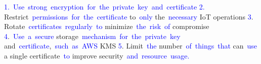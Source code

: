 \documentclass{article}
\begin{document}
\begin{tcolorbox}[colframe=black,colback=white]
{}\textcolor{blue}{1}\textcolor{blue}{.}\textcolor{blue}{~Use}\textcolor{blue}{~strong}\textcolor{blue}{~encryption}\textcolor{blue}{~for}\textcolor{blue}{~the}\textcolor{blue}{~private}\textcolor{blue}{~key}\textcolor{blue}{~and}\textcolor{blue}{~certificate}
\textcolor{blue}{2}\textcolor{blue}{.} Restrict\textcolor{blue}{~permissions}\textcolor{blue}{~for}\textcolor{blue}{~the}\textcolor{blue}{~certificate} to\textcolor{blue}{~only} the\textcolor{blue}{~necessary} IoT operations\textcolor{blue}{
}\textcolor{blue}{3}. Rotate\textcolor{blue}{~certificates}\textcolor{blue}{~regularly}\textcolor{blue}{~to} minimize\textcolor{blue}{~the}\textcolor{blue}{~risk}\textcolor{blue}{~of} compromise\textcolor{blue}{
}\textcolor{blue}{4}.\textcolor{blue}{~Use}\textcolor{blue}{~a}\textcolor{blue}{~secure} storage\textcolor{blue}{~mechanism}\textcolor{blue}{~for}\textcolor{blue}{~the}\textcolor{blue}{~private}\textcolor{blue}{~key} and\textcolor{blue}{~certificate},\textcolor{blue}{~such}\textcolor{blue}{~as}\textcolor{blue}{~AWS} KMS
\textcolor{blue}{5}. Limit\textcolor{blue}{~the} number\textcolor{blue}{~of}\textcolor{blue}{~things}\textcolor{blue}{~that} can\textcolor{blue}{~use} a single certificate\textcolor{blue}{~to} improve security\textcolor{blue}{~and}\textcolor{blue}{~resource}\textcolor{blue}{~usage}\textcolor{blue}{.}\textcolor{blue}{}
\end{tcolorbox}
\end{document}
